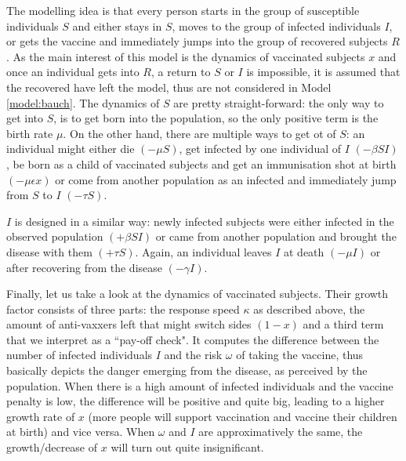 \documentclass[12pt,a4paper,twoside]{article}
\begin{document}
The modelling idea is that every person starts in the group of susceptible individuals $S$ and either stays in $S$, moves to the group of infected individuals $I$, or gets the vaccine and immediately jumps into the group of recovered subjects $R$. As the main interest of this model is the dynamics of vaccinated subjects $x$ and once an individual gets into $R$, a return to $S$ or $I$ is impossible, it is assumed that the recovered have left the model, thus are not considered in Model \ref{model:bauch}. The dynamics of $S$ are pretty straight-forward: the only way to get into $S$, is to get born into the population, so the only positive term is the birth rate $\mu$. On the other hand, there are multiple ways to get ot of $S$: an individual might either die $\left(-\mu S\right)$, get infected by one individual of $I$ $\left(-\beta SI\right)$, be born as a child of vaccinated subjects and get an immunisation shot at birth $\left(-\mu\epsilon x\right)$ or come from another population as an infected and immediately jump from $S$ to $I$ $\left(-\tau S\right)$.\newline

$I$ is designed in a similar way: newly infected subjects were either infected in the observed population $\left(+\beta SI\right)$ or came from another population and brought the disease with them $\left(+\tau S\right)$. Again, an individual leaves $I$ at death $\left(-\mu I\right)$ or after recovering from the disease $\left(-\gamma I\right)$.\newline

Finally, let us take a look at the dynamics of vaccinated subjects. Their growth factor consists of three parts: the response speed $\kappa$ as described above, the amount of anti-vaxxers left that might switch sides $(1-x)$ and a third term that we interpret as a ``pay-off check". It computes the difference between the number of infected individuals $I$ and the risk $\omega$ of taking the vaccine, thus basically depicts the danger emerging from the disease, as perceived by the population. When there is a high amount of infected individuals and the vaccine penalty is low, the difference will be positive and quite big, leading to a higher growth rate of $x$ (more people will support vaccination and vaccine their children at birth) and vice versa. When $\omega$ and $I$ are approximatively the same, the growth/decrease of $x$ will turn out quite insignificant.\newline
\end{document}
